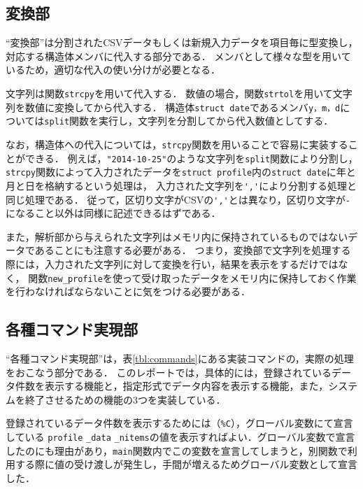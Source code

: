 \documentclass[a4j,11pt]{jarticle}
\begin{document}
\subsection{変換部} \label{sec:exchange}

``変換部''は分割されたCSVデータもしくは新規入力データを項目毎に型変換し，
対応する構造体メンバに代入する部分である．
メンバとして様々な型を用いているため，適切な代入の使い分けが必要となる．

文字列は関数\verb|strcpy|を用いて代入する．
数値の場合，関数\verb|strtol|を用いて文字列を数値に変換してから代入する．
構造体\verb|struct date|であるメンバ\verb|y，m，d|については\verb|split|関数を実行し，文字列を分割してから代入数値としてする．

なお，構造体への代入については，\verb|strcpy|関数を用いることで容易に実装することができる．
例えば，\verb|"2014-10-25"|のような文字列を\verb|split|関数により分割し，
\verb|strcpy|関数によって入力されたデータを\verb|struct profile|内の\verb|struct date|に年と月と日を格納するという処理は，
入力された文字列を\verb|','|により分割する処理と同じ処理である．
従って，区切り文字がCSVの\verb|','|とは異なり，区切り文字が\verb|-|になること以外は同様に記述できるはずである．

また，解析部から与えられた文字列はメモリ内に保持されているものではないデータであることにも注意する必要がある．
つまり，変換部で文字列を処理する際には，入力された文字列に対して変換を行い，結果を表示をするだけではなく，
関数\verb|new_profile|を使って受け取ったデータをメモリ内に保持しておく作業を行わなければならないことに気をつける必要がある．

\subsection{各種コマンド実現部} \label{sec:command}

``各種コマンド実現部''は，表\ref{tbl:commands}にある実装コマンドの，実際の処理をおこなう部分である．
このレポートでは，具体的には，登録されているデータ件数を表示する機能と，指定形式でデータ内容を表示する機能，また，システムを終了させるための機能の3つを実装している．

登録されているデータ件数を表示するためには（\verb|%C|），グローバル変数にて宣言している
\verb|profile| \verb|_data| \verb|_nitems|の値を表示すればよい．グローバル変数で宣言したのにも理由があり，\verb|main|関数内でこの変数を宣言してしまうと，別関数で利用する際に値の受け渡しが発生し，手間が増えるためグローバル変数として宣言した．
\end{document}
